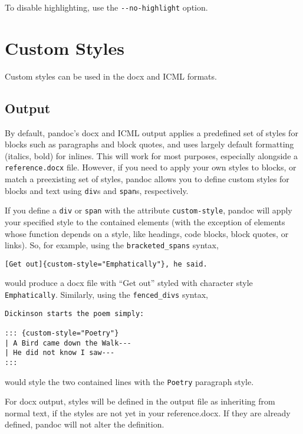 \documentclass[]{article}
\begin{document}
To disable highlighting, use the \texttt{-\/-no-highlight} option.

\hypertarget{custom-styles}{%
\section{Custom Styles}\label{custom-styles}}

Custom styles can be used in the docx and ICML formats.

\hypertarget{output}{%
\subsection{Output}\label{output}}

By default, pandoc's docx and ICML output applies a predefined set of
styles for blocks such as paragraphs and block quotes, and uses largely
default formatting (italics, bold) for inlines. This will work for most
purposes, especially alongside a \texttt{reference.docx} file. However,
if you need to apply your own styles to blocks, or match a preexisting
set of styles, pandoc allows you to define custom styles for blocks and
text using \texttt{div}s and \texttt{span}s, respectively.

If you define a \texttt{div} or \texttt{span} with the attribute
\texttt{custom-style}, pandoc will apply your specified style to the
contained elements (with the exception of elements whose function
depends on a style, like headings, code blocks, block quotes, or links).
So, for example, using the \texttt{bracketed\_spans} syntax,

\begin{verbatim}
[Get out]{custom-style="Emphatically"}, he said.
\end{verbatim}

would produce a docx file with ``Get out'' styled with character style
\texttt{Emphatically}. Similarly, using the \texttt{fenced\_divs}
syntax,

\begin{verbatim}
Dickinson starts the poem simply:

::: {custom-style="Poetry"}
| A Bird came down the Walk---
| He did not know I saw---
:::
\end{verbatim}

would style the two contained lines with the \texttt{Poetry} paragraph
style.

For docx output, styles will be defined in the output file as inheriting
from normal text, if the styles are not yet in your reference.docx. If
they are already defined, pandoc will not alter the definition.
\end{document}
